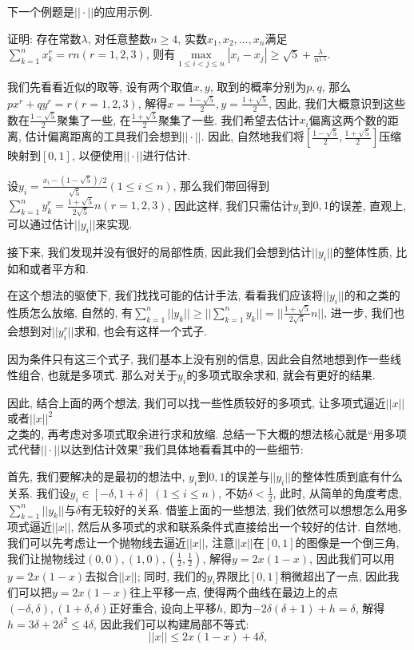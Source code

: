 \documentclass[lang=cn,12pt,thmcnt=section]{elegantbook}
\begin{document}
下一个例题是$||\cdot||$的应用示例.

\begin{example}
证明: 存在常数$\lambda$, 对任意整数$n\ge 4$, 实数$x_1,x_2,\dots{},x_n$满足$\sum_{k=1}^n x_k^r=rn(r=1,2,3)$, 则有$\max\limits_{1\le i<j\le n}|x_i-x_j|\ge \sqrt{5}+\frac{\lambda}{n^{1.5}}$.
\end{example}

\begin{analysis}
我们先看看近似的取等, 设有两个取值$x,y$, 取到的概率分别为$p,q$, 那么$px^r+qy^r=r(r=1,2,3)$, 解得$x=\frac{1-\sqrt{5}}{2},y=\frac{1+\sqrt{5}}{2}$, 因此, 我们大概意识到这些数在$\frac{1-\sqrt{5}}{2}$聚集了一些, 在$\frac{1+\sqrt{5}}{2}$聚集了一些. 我们希望去估计$x_i$偏离这两个数的距离, 估计偏离距离的工具我们会想到$||\cdot||$. 因此, 自然地我们将$[\frac{1-\sqrt{5}}{2},\frac{1+\sqrt{5}}{2}]$压缩映射到$[0,1]$, 以便使用$||\cdot||$进行估计.

设$y_i =\frac{x_i-(1-\sqrt{5})/2}{\sqrt{5}}(1\le i\le n)$, 那么我们带回得到$\sum_{k=1}^n y_k^r= \frac{1+\sqrt{5}}{2\sqrt{5}}n(r=1,2,3)$, 因此这样, 我们只需估计$y_i$到$0,1$的误差, 直观上, 可以通过估计$||y_i||$来实现. 

接下来, 我们发现并没有很好的局部性质, 因此我们会想到估计$||y_i||$的整体性质, 比如和或者平方和.

在这个想法的驱使下, 我们找找可能的估计手法, 看看我们应该将$||y_i||$的和之类的性质怎么放缩, 自然的, 有$\sum_{k=1}^n ||y_k||\ge ||\sum_{k=1}^n y_k||=|| \frac{1+\sqrt{5}}{2\sqrt{5}}n||$, 进一步, 我们也会想到对$||y_i^r||$求和, 也会有这样一个式子.

因为条件只有这三个式子, 我们基本上没有别的信息, 因此会自然地想到作一些线性组合, 也就是多项式. 那么对关于$y_i$的多项式取余求和, 就会有更好的结果. 

因此, 结合上面的两个想法, 我们可以找一些性质较好的多项式, 让多项式逼近$||x||$或者$||x||^2$\\之类的, 再考虑对多项式取余进行求和放缩. 总结一下大概的想法核心就是“{\heiti 用多项式代替}$||\cdot||$以达到估计效果”我们具体地看看其中的一些细节:  

首先, 我们要解决的是最初的想法中, $y_i$到$0,1$的误差与$||y_i||$的整体性质到底有什么关系. 我们设$y_i\in [-\delta,1+\delta]\ (1\le i\le n)$, 不妨$\delta<\frac{1}{2}$, 此时, 从简单的角度考虑, $\sum_{k=1}^n ||y_k||$与$\delta$有无较好的关系. 借鉴上面的一些想法, 我们依然可以想想怎么用多项式逼近$||x||$, 然后从多项式的求和联系条件式直接给出一个较好的估计. 自然地, 我们可以先考虑让一个抛物线去逼近$||x||$, 注意$||x||$在$[0,1]$的图像是一个倒三角, 我们让抛物线过$(0,0),(1,0),(\frac{1}{2},\frac{1}{2})$, 解得$y=2x(1-x)$, 因此我们可以用$y=2x(1-x)$去拟合$||x||$; 同时, 我们的$y_i$界限比$[0,1]$稍微超出了一点, 因此我们可以把$y=2x(1-x)$往上平移一点, 使得两个曲线在最边上的点$(-\delta,\delta),(1+\delta,\delta)$正好重合, 设向上平移$h$, 即为$-2\delta(\delta+1)+h=\delta$, 解得$h=3\delta+2\delta^2\le 4\delta$, 因此我们可以构建局部不等式: 
\[
||x||\le 2x(1-x)+4\delta,
\]


\end{analysis}
\end{document}
